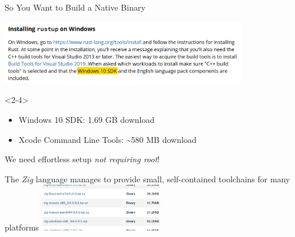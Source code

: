 \documentclass[en,t,navbarkit]{sdqbeamer}
\begin{document}
\begin{frame}{So You Want to Build a Native Binary}

  \includegraphics[width=0.8\textwidth]{rust2.png}
  \pause

  \begin{onlyenv}<2-4>
    \begin{itemize}
      \item Windows 10 SDK: 1.69 GB download \pause
      \item Xcode Command Line Tools: \textasciitilde 580 MB download \pause
    \end{itemize}

    We need effortless setup \emph{not requiring root}!
  \end{onlyenv}
  \pause
  The \emph{Zig} language manages to provide small, self-contained toolchains for many platforms
  \includegraphics[width=0.4\textwidth]{zig3}
\end{frame}
\end{document}

